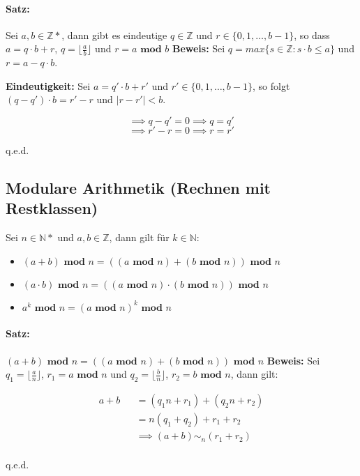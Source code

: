 \documentclass[12pt]{scrreprt}
\newcommand{\theorem}[1]{\paragraph{Satz:} #1\newline}
\renewcommand{\mod}{\textbf{ mod }}
\newenvironment{proof}
    {\textbf{Beweis:}\newline\indent}
    {\begin{flushright}q.e.d.\end{flushright}}
\begin{document}
            \theorem{Sei $ a, b \in \mathbb{Z*} $, dann gibt es eindeutige $ q \in \mathbb{Z} $ und $ r \in \{ 0, 1, \dots, b - 1 \} $, so dass $ a = q \cdot b + r $, $ q = \lfloor \frac{a}{b} \rfloor $ und $ r = a \mod b $}
                \begin{proof}
                    Sei $ q = max \{ s \in \mathbb{Z} : s \cdot b \leq a \} $ und $ r = a - q \cdot b $.

                    \textbf{Eindeutigkeit:}
                    Sei $ a = q' \cdot b + r' $ und $ r' \in \{ 0, 1, \dots, b - 1 \} $, so folgt $ (q - q') \cdot b = r' - r $ und $ \vert r - r' \vert < b $.

                    \[ \implies q - q' = 0 \implies q = q' \]
                    \[ \implies r' - r = 0 \implies r = r' \]
                \end{proof}


            \subsection{Modulare Arithmetik (Rechnen mit Restklassen)}
                Sei $ n \in \mathbb{N*} $ und $ a, b \in \mathbb{Z} $, dann gilt für $ k \in \mathbb{N} $:
                \begin{itemize}
                    \item $ (a + b) \mod n = ((a \mod n) + (b \mod n)) \mod n $
                    \item $ (a \cdot b) \mod n = ((a \mod n) \cdot (b \mod n)) \mod n $
                    \item $ a ^ k \mod n = (a \mod n) ^ k \mod n $
                \end{itemize}

                \theorem{$ (a + b) \mod n = ((a \mod n) + (b \mod n)) \mod n $}
                    \begin{proof}
                        Sei $ q _ 1 = \lfloor \frac{a}{n} \rfloor $, $ r _ 1 = a \mod n $ und $ q _ 2 = \lfloor \frac{b}{n} \rfloor $, $ r _ 2 = b \mod n $, dann gilt:

                        \begin{eqnarray*}
                                 a + b
                            && = (q _ 1 n + r _ 1) + (q _ 2 n + r _ 2)      \\
                            && = n (q _ 1 + q _ 2) + r _ 1 + r _ 2          \\
                            && \implies (a + b) \sim _ n (r _ 1 + r _ 2)    \\
                        \end{eqnarray*}
                    \end{proof}
\end{document}
